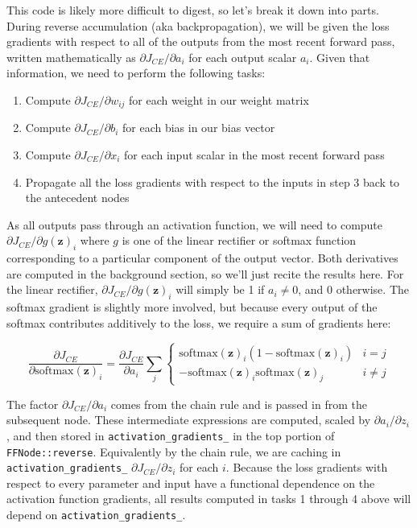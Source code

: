 \documentclass[
]{article}
\providecommand{\tightlist}{%
  \setlength{\itemsep}{0pt}\setlength{\parskip}{0pt}}
\begin{document}
This code is likely more difficult to digest, so let's break it down
into parts. During reverse accumulation (aka backpropagation), we will
be given the loss gradients with respect to all of the outputs from the
most recent forward pass, written mathematically as
\(\partial J_{CE}/\partial a_i\) for each output scalar \(a_i\). Given
that information, we need to perform the following tasks:

\begin{enumerate}
\def\labelenumi{\arabic{enumi}.}
\tightlist
\item
  Compute \(\partial J_{CE}/\partial w_{ij}\) for each weight in our
  weight matrix
\item
  Compute \(\partial J_{CE}/\partial b_i\) for each bias in our bias
  vector
\item
  Compute \(\partial J_{CE}/\partial x_i\) for each input scalar in the
  most recent forward pass
\item
  Propagate all the loss gradients with respect to the inputs in step 3
  back to the antecedent nodes
\end{enumerate}

As all outputs pass through an activation function, we will need to
compute \(\partial J_{CE}/\partial g(\mathbf{z})_i\) where \(g\) is one
of the linear rectifier or softmax function corresponding to a
particular component of the output vector. Both derivatives are computed
in the background section, so we'll just recite the results here. For
the linear rectifier, \(\partial J_{CE}/\partial g(\mathbf{z})_i\) will
simply be 1 if \(a_i \neq 0\), and 0 otherwise. The softmax gradient is
slightly more involved, but because every output of the softmax
contributes additively to the loss, we require a sum of gradients here:

\[\frac{\partial J_{CE}}{\partial \mathrm{softmax}(\mathbf{z})_i} = \frac{\partial J_{CE}}{\partial a_i}\sum_{j} \begin{cases}
\mathrm{softmax}(\mathbf{z})_i\left(1 - \mathrm{softmax}(\mathbf{z})_i\right) & i = j \\
-\mathrm{softmax}(\mathbf{z})_i \mathrm{softmax}(\mathbf{z})_j & i \neq j
\end{cases}\]

The factor \(\partial J_{CE}/\partial a_i\) comes from the chain rule
and is passed in from the subsequent node. These intermediate
expressions are computed, scaled by \(\partial a_i/\partial z_i\), and
then stored in \texttt{activation\_gradients\_} in the top portion of
\texttt{FFNode::reverse}. Equivalently by the chain rule, we are caching
in \texttt{activation\_gradients\_} \(\partial J_{CE}/\partial z_i\) for
each \(i\). Because the loss gradients with respect to every parameter
and input have a functional dependence on the activation function
gradients, all results computed in tasks 1 through 4 above will depend
on \texttt{activation\_gradients\_}.
\end{document}
